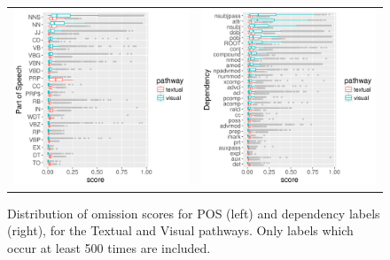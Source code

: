 \label{subsec:omission-text-vis}
\begin{figure}[t]
\setlength{\tabcolsep}{0pt}
  \begin{tabular}{cc}
  \includegraphics[scale=0.55]{imaginet-omission-pos-boxplot.png} &
  \includegraphics[scale=0.55]{imaginet-omission-dep-boxplot.png} \\
  \end{tabular}
  
\caption{Distribution of omission scores for POS (left) and dependency labels
  (right), for the {\sc Textual} and {\sc Visual} pathways. Only labels which occur at least 500 times are included.}
\label{fig:omission-imaginet}
\end{figure}

